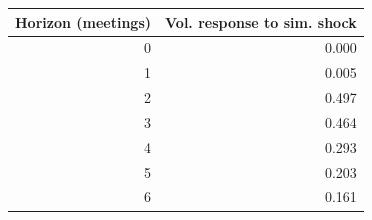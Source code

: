 \begin{tabular}{rr}
\toprule
Horizon (meetings) & Vol. response to sim. shock \\
\midrule
0 & 0.000 \\
1 & 0.005 \\
2 & 0.497 \\
3 & 0.464 \\
4 & 0.293 \\
5 & 0.203 \\
6 & 0.161 \\
\bottomrule
\end{tabular}